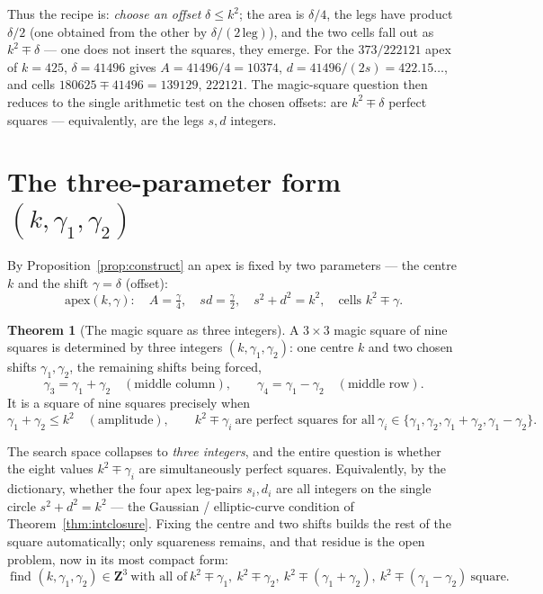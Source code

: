\documentclass[11pt]{article}
\theoremstyle{definition}
\newtheorem{theorem}{Theorem}
\begin{document}
\noindent Thus the recipe is: \emph{choose an offset} $\delta\le k^{2}$; the area
is $\delta/4$, the legs have product $\delta/2$ (one obtained from the other by
$\delta/(2\,\text{leg})$), and the two cells fall out as $k^{2}\mp\delta$ --- one
does not insert the squares, they emerge. For the $373/222121$ apex of $k=425$,
$\delta=41496$ gives $A=41496/4=10374$, $d=41496/(2s)=422.15\ldots$, and cells
$180625\mp41496=139129,\,222121$. The magic-square question then reduces to the
single arithmetic test on the chosen offsets: are $k^{2}\mp\delta$ perfect
squares --- equivalently, are the legs $s,d$ integers.

\section{The three-parameter form $(k,\gamma_1,\gamma_2)$}

By Proposition~\ref{prop:construct} an apex is fixed by two parameters --- the
centre $k$ and the shift $\gamma=\delta$ (offset):
\[
  \text{apex}(k,\gamma):\quad A=\tfrac{\gamma}{4},\quad sd=\tfrac{\gamma}{2},\quad
  s^{2}+d^{2}=k^{2},\quad \text{cells } k^{2}\mp\gamma.
\]

\begin{theorem}[The magic square as three integers]\label{thm:threeparam}
A $3\times3$ magic square of nine squares is determined by three integers
$(k,\gamma_1,\gamma_2)$: one centre $k$ and two chosen shifts $\gamma_1,\gamma_2$,
the remaining shifts being forced,
\[
  \gamma_3=\gamma_1+\gamma_2\quad(\text{middle column}),\qquad
  \gamma_4=\gamma_1-\gamma_2\quad(\text{middle row}).
\]
It is a square of nine squares precisely when
\[
  \gamma_1+\gamma_2\le k^{2}\quad(\text{amplitude}),\qquad
  k^{2}\mp\gamma_i\ \text{are perfect squares for all}\
  \gamma_i\in\{\gamma_1,\gamma_2,\gamma_1+\gamma_2,\gamma_1-\gamma_2\}.
\]
\end{theorem}

\noindent The search space collapses to \emph{three integers}, and the entire
question is whether the eight values $k^{2}\mp\gamma_i$ are simultaneously perfect
squares. Equivalently, by the dictionary, whether the four apex leg-pairs $s_i,d_i$
are all integers on the single circle $s^{2}+d^{2}=k^{2}$ --- the Gaussian /
elliptic-curve condition of Theorem~\ref{thm:intclosure}. Fixing the centre and two
shifts builds the rest of the square automatically; only squareness remains, and
that residue is the open problem, now in its most compact form:
\[
  \boxed{\ \text{find } (k,\gamma_1,\gamma_2)\in\mathbf{Z}^{3}\ \text{with all of}\
  k^{2}\mp\gamma_1,\ k^{2}\mp\gamma_2,\ k^{2}\mp(\gamma_1{+}\gamma_2),\
  k^{2}\mp(\gamma_1{-}\gamma_2)\ \text{square.}\ }
\]
\end{document}

